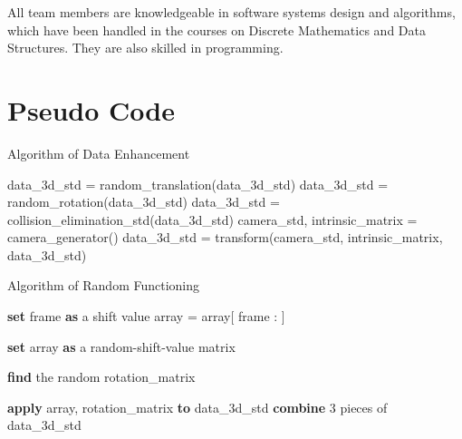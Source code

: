 \documentclass[11pt]{llncs}
\begin{document}
All team members are knowledgeable in software systems design and algorithms, which have been handled in the courses on Discrete Mathematics and Data Structures. They are also skilled in programming. 

\section{Pseudo Code}

\begin{algorithm}[H]
  \caption{Algorithm of Data Enhancement}
  \SetAlgoLined
  
  
  data\_3d\_std = random\_translation(data\_3d\_std)\;
  data\_3d\_std = random\_rotation(data\_3d\_std)\;
  data\_3d\_std = collision\_elimination\_std(data\_3d\_std)\;
  camera\_std, intrinsic\_matrix = camera\_generator()\;
  data\_3d\_std = transform(camera\_std, intrinsic\_matrix, data\_3d\_std)
  

 \;
\end{algorithm}

\begin{algorithm}[H]
	\caption{Algorithm of Random Functioning}
	\SetAlgoLined
	
	
	\textbf{set} frame \textbf{as} a shift value\;
	array = array[ frame : ]\;
	
	\textbf{set} array \textbf{as} a random-shift-value matrix\;
	
	{
		\textbf{find} the random rotation\_matrix\;
	}
	{
		\;
	}
	
	
	\textbf{apply} array, rotation\_matrix \textbf{to} data\_3d\_std\;
	\textbf{combine} 3 pieces of data\_3d\_std\;
	
	
	\;
\end{algorithm}
\end{document}
